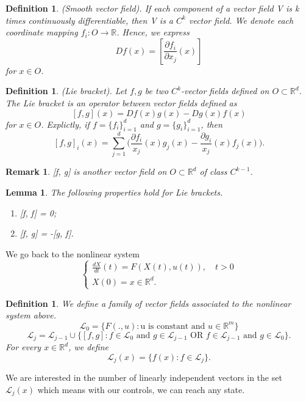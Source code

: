 \documentclass[twoside]{article}
\newtheorem{lemma}[theorem]{Lemma}
\newtheorem{remark}[theorem]{Remark}
\newtheorem{definition}[theorem]{Definition}
\begin{document}
\begin{definition}(Smooth vector field). If each component of a vector field V is k times continuously differentiable, then V is a $C^k$ vector field. We denote each coordinate mapping $f_i: O \rightarrow \mathbb{R}$. Hence, we express
$$
Df(x) = {[\frac{\partial f_i}{\partial x_j}(x)]}
$$
for $x \in O$.
\end{definition}

\begin{definition}(Lie bracket). Let $f,g$ be two $C^k$-vector fields defined on $O \subset \mathbb{R}^d$. The Lie bracket is an operator between vector fields defined as
$$
{[f,g]}(x) = Df(x)g(x) - Dg(x)f(x)
$$
for $x \in O$.
\newline
Explictly, if $f = \{f_i\}_{i=1}^{d}$ and $g = \{g_i\}_{i=1}^{d}$, then 
$$
{[f,g]_i}(x) = \sum_{j=1}^d\big(\frac{\partial f_i}{x_j}(x)g_j(x) -  \frac{\partial g_i}{x_j}(x)f_j(x)\big).
$$
\end{definition}

\begin{remark}{[f, g]} is another vector field on $O \subset \mathbb{R}^d$ of class $C^{k-1}$.
\end{remark}

\begin{lemma}The following properties hold for Lie brackets.
\begin{enumerate}
\item {[f, f]} = 0;
\item {[f, g]} = -{[g, f]}.
\end{enumerate}
\end{lemma}

We go back to the nonlinear system
$$
\begin{cases}
\frac{dX}{dt}(t) = F(X(t), u(t)), \quad t>0 \\
X(0) = x \in \mathbb{R}^d.
\end{cases}
$$

\begin{definition} We define a family of vector fields associated to the nonlinear system above.
$$\mathcal{L}_0 = \{F(., u): \text{u is constant and } u \in \mathbb{R}^m\}$$
$$\mathcal{L}_j = \mathcal{L}_{j-1} \cup \{ [f, g]: f \in \mathcal{L}_0 \text{ and } g \in \mathcal{L}_{j-1} \text{ OR } f \in \mathcal{L}_{j-1} \text{ and } g \in \mathcal{L}_{0}\}.
$$
\newline
For every $x \in \mathbb{R}^d$, we define 
$$
\mathcal{L}_j(x) = \{f(x): f \in \mathcal{L}_j\}.
$$
\end{definition}
We are interested in the number of linearly independent vectors in the set $\mathcal{L}_j(x)$ which means with our controls, we can reach any state.
\end{document}
